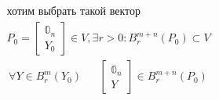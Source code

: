 \documentclass[main]{subfiles}
\begin{document}
\begin{longProof}
\begin{gather*}
             \text{хотим выбрать такой вектор} \\
             P_0 =  \begin{bmatrix*}
               \mathbb{0}_n \\
               Y_0
             \end{bmatrix*} \in V, \exists r > 0 : B_r^{m+n}(P_0) \subset V 
            \end{gather*}
             \begin{align*}
               \forall Y \in B_r^m(Y_0)  && \begin{bmatrix*}
                  \mathbb{0}_n \\
                  Y 
               \end{bmatrix*} \in B_r^{m+n}(P_0)
             \end{align*}
 

\end{longProof}
\end{document}
